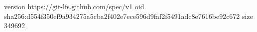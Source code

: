 version https://git-lfs.github.com/spec/v1
oid sha256:d554f350ef9a934275a5cba2f402e7ece596d9faf2f5491adc8e7616be92c672
size 349692
